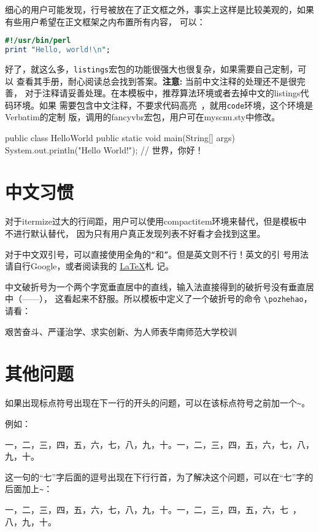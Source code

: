 细心的用户可能发现，行号被放在了正文框之外，事实上这样是比较美观的，如果有些用户希望在正文框架之内布置所有内容，
可以：
\begin{lstlisting}[language=perl,xleftmargin=2em,framexleftmargin=1.5em]
#!/usr/bin/perl
print "Hello, world!\n";
\end{lstlisting}

好了，就这么多，\texttt{listings}宏包的功能很强大也很复杂，如果需要自己定制，可以
查看其手册，耐心阅读总会找到答案。\textbf{注意:} 当前中文注释的处理还不是很完善，
对于注释请妥善处理。在本模板中，推荐算法环境或者去掉中文的listings代码环境。如果
需要包含中文注释，不要求代码高亮~，就用\texttt{code}环境，这个环境是Verbatim的定制
版，调用的fancyvbr宏包，用户可在myscnu.sty中修改。

\begin{code}
public class HelloWorld {
   public static void main(String[] args) {
      System.out.println("Hello World!");
   }
}   // 世界，你好！
\end{code}

\section{中文习惯}
\label{sec:chinese}

对于itermize过大的行间距，用户可以使用compactitem环境来替代，但是模板中不进行默认替代，
因为只有用户真正发现列表不好看才会找到这里。

对于中文双引号，可以直接使用全角的\verb|“|和\verb|”|。但是英文则不行！英文的引
号用法请自行Google，或者阅读我的
\href{https://dl.dropbox.com/u/49734213/LaTeX%E6%9C%AD%E8%AE%B0.pdf}{\LaTeX{}}札
记。

中文破折号为一个两个字宽垂直居中的直线，输入法直接得到的破折号没有垂直居中（——），
这看起来不舒服。所以模板中定义了一个破折号的命令 \verb|\pozhehao|，请看：

艰苦奋斗、严谨治学、求实创新、为人师表\hfill \pozhehao{}华南师范大学校训

\section{其他问题}
\label{sec:other}

如果出现标点符号出现在下一行的开头的问题，可以在该标点符号之前加一个\verb|~|。

例如：

一，二，三，四，五，六，七，八，九，十。一，二，三，四，五，六，七，八，九，十。

这一句的“七”字后面的逗号出现在下行行首，为了解决这个问题，可以在“七”字的后面加上\verb|~|：

一，二，三，四，五，六，七，八，九，十。一，二，三，四，五，六，七~，八，九，十。
